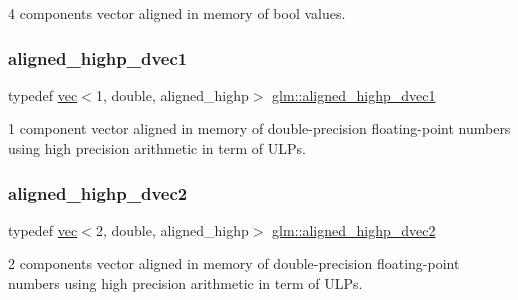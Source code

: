 4 components vector aligned in memory of bool values. 

\mbox{\label{group__gtc__type__aligned_ga85671dcb7eef983b5035273fe78dd963}} 
\subsubsection{\texorpdfstring{aligned\+\_\+highp\+\_\+dvec1}{aligned\_highp\_dvec1}}
{\footnotesize\ttfamily typedef \mbox{\hyperlink{structglm_1_1vec}{vec}}$<$1, double, aligned\+\_\+highp$>$ \mbox{\hyperlink{group__gtc__type__aligned_ga85671dcb7eef983b5035273fe78dd963}{glm\+::aligned\+\_\+highp\+\_\+dvec1}}}



1 component vector aligned in memory of double-\/precision floating-\/point numbers using high precision arithmetic in term of U\+L\+Ps. 

\mbox{\label{group__gtc__type__aligned_gadc0edec95aa740d8ec351ef1e2dd39de}} 
\subsubsection{\texorpdfstring{aligned\+\_\+highp\+\_\+dvec2}{aligned\_highp\_dvec2}}
{\footnotesize\ttfamily typedef \mbox{\hyperlink{structglm_1_1vec}{vec}}$<$2, double, aligned\+\_\+highp$>$ \mbox{\hyperlink{group__gtc__type__aligned_gadc0edec95aa740d8ec351ef1e2dd39de}{glm\+::aligned\+\_\+highp\+\_\+dvec2}}}



2 components vector aligned in memory of double-\/precision floating-\/point numbers using high precision arithmetic in term of U\+L\+Ps. 

\mbox{\label{group__gtc__type__aligned_gafb21f8db25007665c2cb2a9b250471aa}} 

